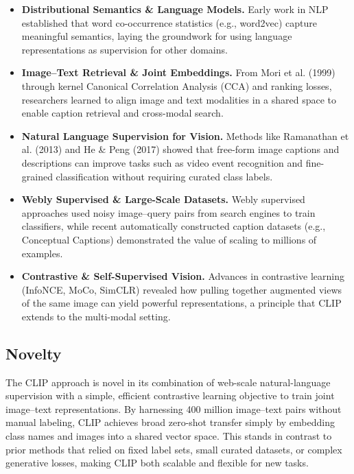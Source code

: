 \documentclass[10pt]{article}
\begin{document}
\begin{itemize}
    \item \textbf{Distributional Semantics \& Language Models.} Early work in NLP established that word co-occurrence statistics (e.g., word2vec\cite{word2vec}) capture meaningful semantics, laying the groundwork for using language representations as supervision for other domains.
    \item \textbf{Image–Text Retrieval \& Joint Embeddings.} From Mori et al. (1999)\cite{Mori1999ImagetowordTB} through kernel Canonical Correlation Analysis (CCA)\cite{10.1007/s10994-010-5198-3} and ranking losses\cite{10.1109/CVPR.2010.5540112}, researchers learned to align image and text modalities in a shared space to enable caption retrieval and cross-modal search.
    \item \textbf{Natural Language Supervision for Vision.} Methods like Ramanathan et al. (2013)\cite{10.1109/ICCV.2013.117} and He \& Peng (2017)\cite{DBLP:journals/corr/HeP17} showed that free-form image captions and descriptions can improve tasks such as video event recognition and fine-grained classification without requiring curated class labels.
    \item \textbf{Webly Supervised \& Large-Scale Datasets.} Webly supervised approaches \cite{1544937,Divvala2014LearningEA} used noisy image–query pairs from search engines to train classifiers, while recent automatically constructed caption datasets (e.g., Conceptual Captions) demonstrated the value of scaling to millions of examples.
    \item \textbf{Contrastive \& Self-Supervised Vision.} Advances in contrastive learning (InfoNCE\cite{DBLP:journals/corr/abs-1807-03748}, MoCo\cite{DBLP:journals/corr/abs-1911-05722}, SimCLR\cite{DBLP:journals/corr/abs-2002-05709}) revealed how pulling together augmented views of the same image can yield powerful representations, a principle that CLIP extends to the multi-modal setting.
\end{itemize}


\subsection*{Novelty}

The CLIP approach is novel in its combination of web-scale natural-language supervision with a simple, efficient contrastive learning objective to train joint image–text representations. By harnessing 400 million image–text pairs without manual labeling, CLIP achieves broad zero-shot transfer simply by embedding class names and images into a shared vector space. This stands in contrast to prior methods that relied on fixed label sets, small curated datasets, or complex generative losses, making CLIP both scalable and flexible for new tasks.
\end{document}
